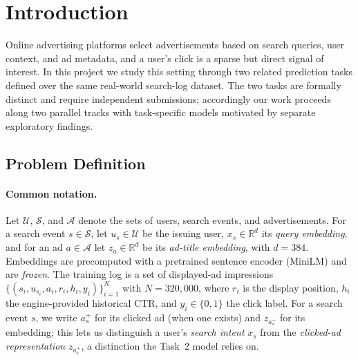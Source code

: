 \documentclass[sigconf, nonacm]{acmart}
\begin{document}
\section{Introduction}
\label{sec:intro}

Online advertising platforms select advertisements based on search queries,
user context, and ad metadata, and a user's click is a sparse but direct signal
of interest. In this project we study this setting through two related
prediction tasks defined over the same real-world search-log dataset. The two
tasks are formally distinct and require independent submissions; accordingly our
work proceeds along two parallel tracks with task-specific models motivated by
separate exploratory findings.

\subsection{Problem Definition}

\paragraph{Common notation.}
Let $\mathcal{U}$, $\mathcal{S}$, and $\mathcal{A}$ denote the sets of users,
search events, and advertisements. For a search event $s\in\mathcal{S}$, let
$u_s\in\mathcal{U}$ be the issuing user, $x_s\in\mathbb{R}^d$ its
\emph{query embedding}, and for an ad $a\in\mathcal{A}$ let $z_a\in\mathbb{R}^d$
be its \emph{ad-title embedding}, with $d=384$. Embeddings are precomputed with
a pretrained sentence encoder (MiniLM) and are \emph{frozen}. The training log
is a set of displayed-ad impressions
$\{(s_i,u_{s_i},a_i,r_i,h_i,y_i)\}_{i=1}^{N}$ with $N=320{,}000$, where
$r_i$ is the display position, $h_i$ the engine-provided historical CTR, and
$y_i\in\{0,1\}$ the click label. For a search event $s$, we write $a_s^+$ for
its clicked ad (when one exists) and $z_{a_s^+}$ for its embedding; this lets us
distinguish a user's \emph{search intent} $x_s$ from the \emph{clicked-ad
representation} $z_{a_s^+}$, a distinction the Task~2 model relies on.
\end{document}
